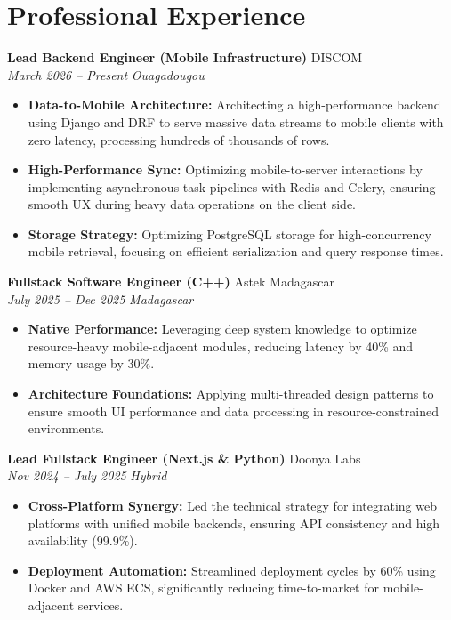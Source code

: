 \documentclass[a4paper,10pt]{article}
\newcommand{\jobheader}[4]{%
    \textbf{#1} \hfill #2 \\
    \textit{#3} \hfill \textit{#4}
    \vspace{0.05cm}
}
\begin{document}
\section*{Professional Experience}

\jobheader{Lead Backend Engineer (Mobile Infrastructure)}{DISCOM}{March 2026 -- Present}{Ouagadougou}
\begin{itemize}[leftmargin=*,nosep]
    \item \textbf{Data-to-Mobile Architecture:} Architecting a high-performance backend using Django and DRF to serve massive data streams to mobile clients with zero latency, processing hundreds of thousands of rows.
    \item \textbf{High-Performance Sync:} Optimizing mobile-to-server interactions by implementing asynchronous task pipelines with Redis and Celery, ensuring smooth UX during heavy data operations on the client side.
    \item \textbf{Storage Strategy:} Optimizing PostgreSQL storage for high-concurrency mobile retrieval, focusing on efficient serialization and query response times.
\end{itemize}

\vspace{0.15cm}

\jobheader{Fullstack Software Engineer (C++)}{Astek Madagascar}{July 2025 -- Dec 2025}{Madagascar}
\begin{itemize}[leftmargin=*,nosep]
    \item \textbf{Native Performance:} Leveraging deep system knowledge to optimize resource-heavy mobile-adjacent modules, reducing latency by 40\% and memory usage by 30\%.
    \item \textbf{Architecture Foundations:} Applying multi-threaded design patterns to ensure smooth UI performance and data processing in resource-constrained environments.
\end{itemize}

\vspace{0.15cm}

\jobheader{Lead Fullstack Engineer (Next.js \& Python)}{Doonya Labs}{Nov 2024 -- July 2025}{Hybrid}
\begin{itemize}[leftmargin=*,nosep]
    \item \textbf{Cross-Platform Synergy:} Led the technical strategy for integrating web platforms with unified mobile backends, ensuring API consistency and high availability (99.9\%).
    \item \textbf{Deployment Automation:} Streamlined deployment cycles by 60\% using Docker and AWS ECS, significantly reducing time-to-market for mobile-adjacent services.
\end{itemize}
\end{document}
